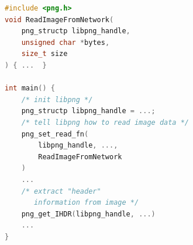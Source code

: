 \documentclass[tikz]{standalone}
\begin{document}
\begin{lrbox}{\libCrossCode}
\begin{lstlisting}[language=C++,style=script]
#include <png.h>
void ReadImageFromNetwork(
    png_structp libpng_handle,
    unsigned char *bytes,
    size_t size
) { ...  }

int main() {
    /* init libpng */
    png_structp libpng_handle = ...;
    /* tell libpng how to read image data */
    png_set_read_fn(
        libpng_handle, ...,
        ReadImageFromNetwork
    )
    ...
    /* extract "header" 
       information from image */
    png_get_IHDR(libpng_handle, ...)
    ...
}
\end{lstlisting}
\end{lrbox}


\end{document}
